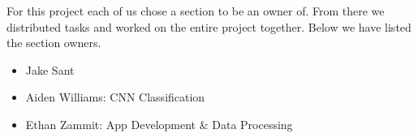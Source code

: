 For this project each of us chose a section to be an owner of.
From there we distributed tasks and worked on the entire project together.
Below we have listed the section owners.

\begin{itemize}

    \item Jake Sant

    \item Aiden Williams: CNN Classification

    \item Ethan Zammit: App Development \& Data Processing

\end{itemize}